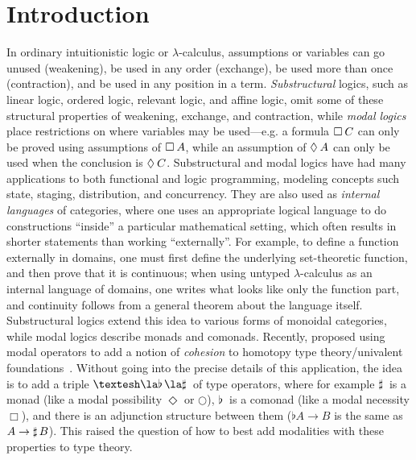 
\section{Introduction}

In ordinary intuitionistic logic or $\lambda$-calculus, assumptions or
variables can go unused (weakening), be used in any order (exchange), be
used more than once (contraction), and be used in any position in a
term.  \emph{Substructural} logics, such as linear logic, ordered logic,
relevant logic, and affine logic, omit some of these structural
properties of weakening, exchange, and contraction, while \emph{modal
  logics} place restrictions on where variables may be used---e.g. a
formula $\Box_{} \, {C}$ can only be proved using assumptions of $\Box_{} \, {A}$,
while an assumption of $\Diamond_{} \, {A}$ can only be used when the conclusion
is $\Diamond_{} \, {C}$.  Substructural and modal logics have had many
applications to both functional and logic programming, modeling concepts
such state, staging, distribution, and concurrency.
They are also used as \emph{internal languages} of categories, where one
uses an appropriate logical language to do constructions ``inside'' a
particular mathematical setting, which often results in shorter
statements than working ``externally''.  For example, to define a
function externally in domains, one must first define the underlying
set-theoretic function, and then prove that it is continuous; when using
untyped $\lambda$-calculus as an internal language of domains, one
writes what looks like only the function part, and continuity follows
from a general theorem about the language itself.  Substructural logics
extend this idea to various forms of monoidal categories, while modal
logics describe monads and comonads.  Recently,
\citet{schreibershulman12cohesive,shulman15realcohesion} proposed using
modal operators to add a notion of \emph{cohesion} to homotopy type
theory/univalent foundations~\citep{voevodsky06homotopy,uf13hott-book}.
Without going into the precise details of this application, the idea is
to add a triple $\sh{} \la \Flat{} \la \Sharp{}$ of type operators,
where for example $\sharp \, {}$ is a monad (like a modal possibility
$\Diamond$ or $\bigcirc$), $\flat \, {}$ is a comonad (like a modal
necessity $\Box$), and there is an adjunction structure between them
($\flat{A} \to B$ is the same as $A \to \sharp \, {B}$).  This raised the
question of how to best add modalities with these properties to type
theory.

